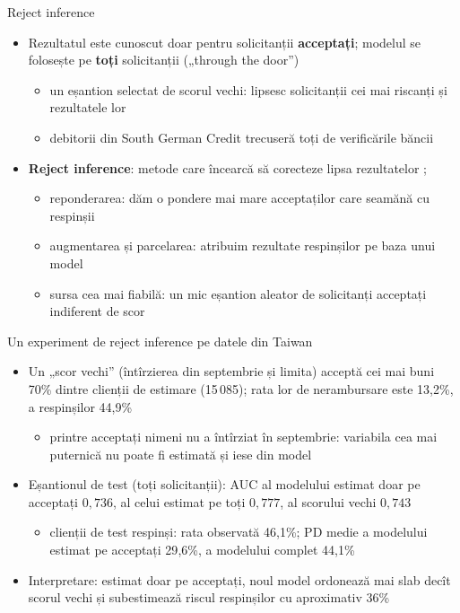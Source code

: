 \begin{frame}{Reject inference}
\itemsize{\small}
\begin{itemize}
    \item Rezultatul este cunoscut doar pentru solicitanții \textbf{acceptați}; modelul se folosește pe \textbf{toți} solicitanții („through the door”)
    \begin{itemize}
        \item un eșantion selectat de scorul vechi: lipsesc solicitanții cei mai riscanți și rezultatele lor
        \item debitorii din South German Credit trecuseră toți de verificările băncii 
    \end{itemize}
    \item \textbf{Reject inference}: metode care încearcă să corecteze lipsa rezultatelor ; 
    \begin{itemize}
        \item reponderarea: dăm o pondere mai mare acceptaților care seamănă cu respinșii
        \item augmentarea și parcelarea: atribuim rezultate respinșilor pe baza unui model
        \item sursa cea mai fiabilă: un mic eșantion aleator de solicitanți acceptați indiferent de scor
    \end{itemize}
\end{itemize}
\end{frame}

\begin{frame}{Un experiment de reject inference pe datele din Taiwan}
\itemsize{\footnotesize}
\begin{itemize}
    \item Un „scor vechi” (întîrzierea din septembrie și limita) acceptă cei mai buni 70\% dintre clienții de estimare (15\,085); rata lor de nerambursare este 13{,}2\%, a respinșilor 44{,}9\%
    \begin{itemize}
        \item printre acceptați nimeni nu a întîrziat în septembrie: variabila cea mai puternică nu poate fi estimată și iese din model
    \end{itemize}
    \item Eșantionul de test (toți solicitanții): AUC al modelului estimat doar pe acceptați $0{,}736$, al celui estimat pe toți $0{,}777$, al scorului vechi $0{,}743$
    \begin{itemize}
        \item clienții de test respinși: rata observată 46{,}1\%; PD medie a modelului estimat pe acceptați 29{,}6\%, a modelului complet 44{,}1\%
    \end{itemize}
    \item Interpretare: estimat doar pe acceptați, noul model ordonează mai slab decît scorul vechi și subestimează riscul respinșilor cu aproximativ 36\%
\end{itemize}
\end{frame}

